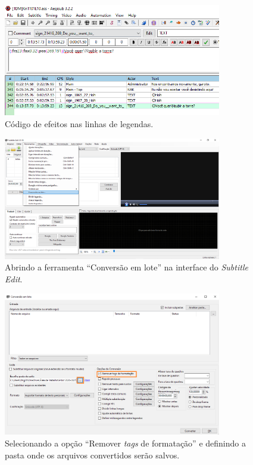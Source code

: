 \documentclass[portuguese]{textolivre}
\begin{document}
\begin{figure}[htbp]
 \centering
 \includegraphics[width=0.85\textwidth]{Fig17.png}
 \caption{Código de efeitos nas linhas de legendas.}
 \label{fig17}
\end{figure}

\begin{figure}[htbp]
 \centering
 \includegraphics[width=0.85\textwidth]{Fig18.png}
 \caption{Abrindo a ferramenta “Conversão em lote” na interface do \textit{Subtitle Edit}.}
 \label{fig18}
\end{figure}

\begin{figure}[htbp]
 \centering
 \includegraphics[width=0.85\textwidth]{Fig19.png}
 \caption{Selecionando a opção “Remover \textit{tags} de formatação” 
e definindo a pasta onde os arquivos convertidos serão salvos.}
 \label{fig19}
\end{figure}
\end{document}
